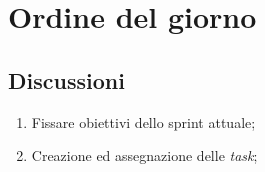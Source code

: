 \section{Ordine del giorno} \label{sec:agenda}
\subsection{Discussioni} \label{subsec:discussione}
\begin{enumerate}
     \item Fissare obiettivi dello sprint attuale;
     \item Creazione ed assegnazione delle \emph{task};
\end{enumerate}

